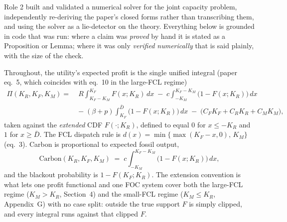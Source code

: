 %

\label{part:role2}

Role 2 built and validated a numerical solver for the joint capacity problem,
independently re-deriving the paper's closed forms rather than transcribing
them, and using the solver as a lie-detector on the theory. Everything below is
grounded in code that was run: where a claim was \emph{proved} by hand it is
stated as a Proposition or Lemma; where it was only \emph{verified numerically}
that is said plainly, with the size of the check.

Throughout, the utility's expected profit is the single unified integral (paper
eq.~5, which coincides with eq.~10 in the large-FCL regime)
\begin{equation}
\label{eq:r2-profit}
\begin{aligned}
\Pi(K_R,K_F,K_M) =\;& R\!\int_{K_F-K_M}^{K_F}\! F(x;K_R)\,dx
   \;-\; c\!\int_{-K_M}^{K_F-K_M}\!\bigl(1-F(x;K_R)\bigr)\,dx \\[2pt]
   &-\;(\beta+p)\!\int_{K_F}^{\bar D}\!\bigl(1-F(x;K_R)\bigr)\,dx
   \;-\;\bigl(C_F K_F + C_R K_R + C_M K_M\bigr),
\end{aligned}
\end{equation}
taken against the \emph{extended} CDF $F(\cdot;K_R)$, defined to equal $0$ for
$x\le -K_R$ and $1$ for $x\ge \bar D$. The FCL dispatch rule is
$d(x)=\min\{\max(K_F-x,0),\,K_M\}$ (eq.~3). Carbon is proportional to expected
fossil output,
\begin{equation}
\label{eq:r2-carbon}
\mathrm{Carbon}(K_R,K_F,K_M) \;=\; c\!\int_{-K_M}^{K_F-K_M}\!\bigl(1-F(x;K_R)\bigr)\,dx,
\end{equation}
and the blackout probability is $1-F(K_F;K_R)$. The extension convention is what
lets one profit functional and one FOC system cover both the large-FCL regime
($K_M>K_R$, Section~4) and the small-FCL regime ($K_M\le K_R$, Appendix~G) with
no case split: outside the true support $F$ is simply clipped, and every
integral runs against that clipped $F$.

